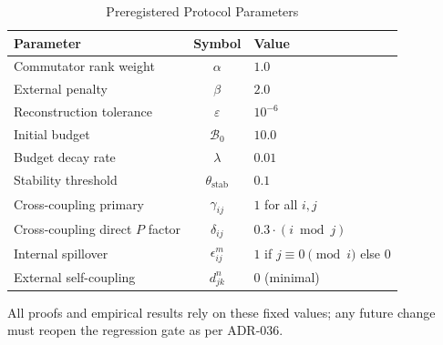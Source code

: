 \documentclass[12pt]{article}
\theoremstyle{plain}
\theoremstyle{definition}
\theoremstyle{remark}
\begin{document}
\begin{table}[htbp]
\centering
\caption{Preregistered Protocol Parameters}
\label{tab:params}
\begin{tabular}{lcl}
\toprule
\textbf{Parameter} & \textbf{Symbol} & \textbf{Value} \\
\midrule
Commutator rank weight & $\alpha$ & $1.0$ \\
External penalty & $\beta$ & $2.0$ \\
Reconstruction tolerance & $\varepsilon$ & $10^{-6}$ \\
Initial budget & $\mathcal{B}_0$ & $10.0$ \\
Budget decay rate & $\lambda$ & $0.01$ \\
Stability threshold & $\theta_{\text{stab}}$ & $0.1$ \\
Cross-coupling primary & $\gamma_{ij}$ & $1$ for all $i,j$ \\
Cross-coupling direct $P$ factor & $\delta_{ij}$ & $0.3 \cdot (i \bmod j)$ \\
Internal spillover & $\epsilon_{ij}^m$ & $1$ if $j \equiv 0 \pmod{i}$ else $0$ \\
External self-coupling & $d_{jk}^n$ & $0$ (minimal) \\
\bottomrule
\end{tabular}
\end{table}

All proofs and empirical results rely on these fixed values; any future change must reopen the regression gate as per ADR-036.

\nocite{*}


\end{document}
